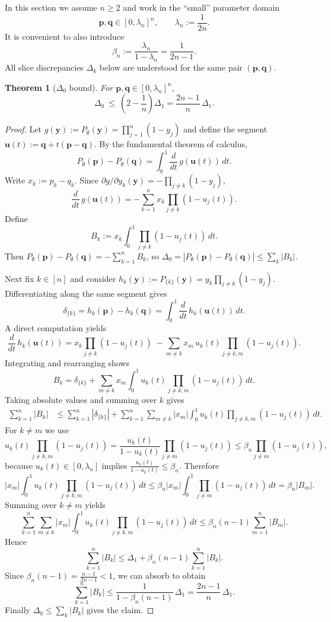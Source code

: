 \documentclass[11pt]{amsart}
\numberwithin{equation}{section}
\newtheorem{theorem}{Theorem}[section]
\theoremstyle{definition}
\newcommand{\abs}[1]{\left|#1\right|}
\newcommand{\vct}[1]{\mathbf{#1}}
\newcommand{\pvec}{\vct{p}}
\newcommand{\qvec}{\vct{q}}
\newcommand{\yvec}{\vct{y}}
\newcommand{\uvec}{\vct{u}}
\newcommand{\lam}{\lambda}
\begin{document}
In this section we assume $n\ge 2$ and work in the 
``small'' parameter domain
\begin{equation}\label{eq:small_regime_domain}
\pvec,\qvec\in[0,\lam_n]^n,\qquad \lam_n:=\frac{1}{2n}.
\end{equation}
It is convenient to also introduce
\begin{equation}\label{eq:beta_def}
\beta_n:=\frac{\lam_n}{1-\lam_n}=\frac{1}{2n-1}.
\end{equation}
All slice discrepancies $\Delta_k$ below are understood for the same pair $(\pvec,\qvec)$.

\begin{theorem}[$\Delta_0$ bound]\label{thm:Delta0_bound}
For $\pvec,\qvec\in[0,\lam_n]^n$,
\[
\Delta_0\ \le\ \left(2-\frac1n\right)\Delta_1
=\frac{2n-1}{n}\,\Delta_1.
\]
\end{theorem}

\begin{proof}
Let $g(\yvec):=P_\emptyset(\yvec)=\prod_{j=1}^n(1-y_j)$ and define the segment $\uvec(t):=\qvec+t(\pvec-\qvec)$.
By the fundamental theorem of calculus,
\[
P_\emptyset(\pvec)-P_\emptyset(\qvec)=\int_0^1\frac{d}{dt}\,g(\uvec(t))\,dt.
\]
Write $x_k:=p_k-q_k$.
Since $\partial g/\partial y_k(\yvec)=-\prod_{j\neq k}(1-y_j)$,
\[
\frac{d}{dt}\,g(\uvec(t))=-\sum_{k=1}^n x_k\prod_{j\neq k}(1-u_j(t)).
\]
Define
\[
B_k:=x_k\int_0^1\prod_{j\neq k}(1-u_j(t))\,dt.
\]
Then $P_\emptyset(\pvec)-P_\emptyset(\qvec)=-\sum_{k=1}^n B_k$, so
$\Delta_0=\abs{P_\emptyset(\pvec)-P_\emptyset(\qvec)}\le \sum_k\abs{B_k}$.

Next fix $k\in[n]$ and consider $h_k(\yvec):=P_{\{k\}}(\yvec)=y_k\prod_{j\neq k}(1-y_j)$.
Differentiating along the same segment gives
\[
\delta_{\{k\}}=h_k(\pvec)-h_k(\qvec)=\int_0^1\frac{d}{dt}\,h_k(\uvec(t))\,dt.
\]
A direct computation yields
\[
\frac{d}{dt}\,h_k(\uvec(t))
=x_k\prod_{j\neq k}(1-u_j(t))\;-
\sum_{m\neq k} x_m\,u_k(t)\prod_{j\neq k,m}(1-u_j(t)).
\]
Integrating and rearranging shows
\[
B_k
=\delta_{\{k\}}+\sum_{m\neq k}x_m\int_0^1 u_k(t)\prod_{j\neq k,m}(1-u_j(t))\,dt.
\]
Taking absolute values and summing over $k$ gives
\begin{align*}
\sum_{k=1}^n\abs{B_k}
&\le \sum_{k=1}^n\abs{\delta_{\{k\}}}
 +\sum_{k=1}^n\sum_{m\neq k}\abs{x_m}\int_0^1 u_k(t)\prod_{j\neq k,m}(1-u_j(t))\,dt.
\end{align*}
For $k\neq m$ we use
\[
u_k(t)\prod_{j\neq k,m}(1-u_j(t))
=\frac{u_k(t)}{1-u_k(t)}\prod_{j\neq m}(1-u_j(t))
\le \beta_n\prod_{j\neq m}(1-u_j(t)),
\]
because $u_k(t)\in[0,\lam_n]$ implies $\frac{u_k(t)}{1-u_k(t)}\le \beta_n$.
Therefore
\[
\abs{x_m}\int_0^1 u_k(t)\prod_{j\neq k,m}(1-u_j(t))\,dt
\le \beta_n\abs{x_m}\int_0^1\prod_{j\neq m}(1-u_j(t))\,dt
=\beta_n\abs{B_m}.
\]
Summing over $k\neq m$ yields
\[
\sum_{k=1}^n\sum_{m\neq k}\abs{x_m}\int_0^1 u_k(t)\prod_{j\neq k,m}(1-u_j(t))\,dt
\le \beta_n(n-1)\sum_{m=1}^n\abs{B_m}.
\]
Hence
\[
\sum_{k=1}^n\abs{B_k}\le \Delta_1+\beta_n(n-1)\sum_{k=1}^n\abs{B_k}.
\]
Since $\beta_n(n-1)=\frac{n-1}{2n-1}<1$, we can absorb to obtain
\[
\sum_{k=1}^n\abs{B_k}\le \frac{1}{1-\beta_n(n-1)}\,\Delta_1=\frac{2n-1}{n}\,\Delta_1.
\]
Finally $\Delta_0\le\sum_k\abs{B_k}$ gives the claim.
\end{proof}
\end{document}
